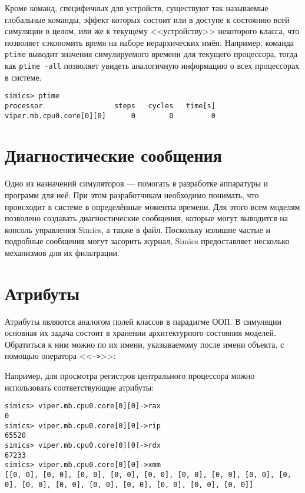 Кроме команд, специфичных для устройств, существуют так называемые глобальные команды, эффект которых состоит или в доступе к состоянию всей симуляции в целом, или же к текущему <<устройству>> некоторого класса, что позволяет сэкономить время на наборе иерархических имён. Например, команда \texttt{ptime} выводит значения симулируемого времени для текущего процессора, тогда как \texttt{ptime -all} позволяет увидеть аналогичную информацию о всех процессорах в системе.

\begin{lstlisting}
simics> ptime
processor                 steps   cycles   time[s]
viper.mb.cpu0.core[0][0]      0        0         0
\end{lstlisting}



\section{Диагностические сообщения}

Одно из назначений симуляторов --- помогать в разработке аппаратуры и программ для неё. При этом разработчикам необходимо понимать, что происходит в системе в определённые моменты времени. Для этого всем моделям позволено создавать диагностические сообщения, которые могут выводится на консоль управления Simics, а также в файл. Поскольку излишне частые и подробные сообщения могут засорить журнал, Simics предоставляет несколько механизмов для их фильтрации.



\section{Атрибуты}

Атрибуты являются аналогом полей классов в парадигме ООП. В симуляции основная их задача состоит в хранении архитектурного состояния моделей. Обратиться к ним можно по их имени, указываемому после имени объекта, с помощью оператора <<\texttt{->}>>:

Например, для просмотра регистров центрального процессора можно использовать соответствующие атрибуты:
\begin{lstlisting}
simics> viper.mb.cpu0.core[0][0]->rax
0
simics> viper.mb.cpu0.core[0][0]->rip
65520
simics> viper.mb.cpu0.core[0][0]->rdx
67233
simics> viper.mb.cpu0.core[0][0]->xmm
[[0, 0], [0, 0], [0, 0], [0, 0], [0, 0], [0, 0], [0, 0], [0, 0], [0, 0], [0, 0], [0, 0], [0, 0], [0, 0], [0, 0], [0, 0], [0, 0]]
\end{lstlisting}

